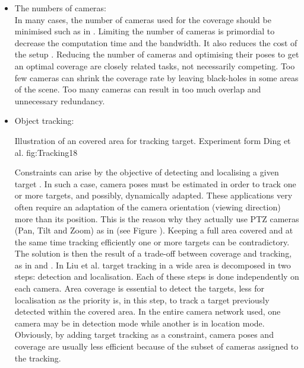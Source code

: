 \begin{itemize}
\item  The numbers of cameras: \\ In many cases,  the number of cameras used for the coverage should be minimised such as in  \cite{151*zhao2013,171*horster2006,22*zhao2008}. Limiting the number of cameras is primordial to decrease the computation time and the bandwidth. It also reduces the cost of the setup \cite{82*chrysostomou2012}. Reducing the number of cameras and optimising their poses to get an optimal coverage are closely related tasks, not necessarily competing. Too few cameras can shrink the coverage rate by leaving black-holes in some areas of the scene. Too many cameras can result in too much overlap and unnecessary redundancy.\\

\item Object tracking: \\
\begin{mfigures}[!]{Illustration of an covered area for tracking target. Experiment  form Ding et al. \citep{18*ding2012} }{fig:Tracking18} \centering
{}
\hspace{1cm} \\
\end{mfigures}	
 Constraints can arise by the objective of detecting and localising a given target \cite{18*ding2012,12*soto2009,23*liu2009,39*wu2011,40*sohrabi2000,22*zhao2008}. In such a case, camera poses must be estimated in order to track one or more targets, and possibly, dynamically adapted. These applications very often require an adaptation of the camera orientation (viewing direction) more than its position. This is the reason why they actually use PTZ cameras (Pan, Tilt and Zoom) as in \cite{18*ding2012,38*liu2010,12*soto2009} (see Figure \citep{18*ding2012}).
Keeping a full area covered and at the same time tracking efficiently one or more targets can be contradictory. The solution is then the result of a trade-off between coverage and tracking, as in \cite{18*ding2012} and \cite{38*liu2010}.
 In Liu et al. \cite{38*liu2010} target tracking in a wide area is decomposed in two steps: detection and localisation. Each of these steps is done independently on each camera. Area coverage is essential to detect the targets, less for localisation as the priority is, in this step, to track a target previously detected within the covered area. In the entire camera network used, one camera may be in detection mode while another is in location mode. Obviously, by adding target tracking as a constraint, camera poses and coverage are usually less efficient because of the subset of cameras assigned to the tracking.  \\


\end{itemize}
